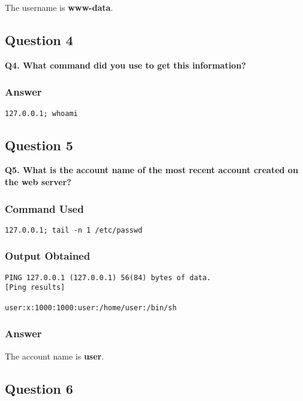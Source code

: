 \documentclass[12pt]{article}
\begin{document}
The username is \textbf{www-data}.

\subsection{Question 4}

\textbf{Q4. What command did you use to get this information?}

\subsubsection{Answer}



\begin{lstlisting}[style=terminal]
127.0.0.1; whoami
\end{lstlisting}

\subsection{Question 5}

\textbf{Q5. What is the account name of the most recent account created on the web server?}

\subsubsection{Command Used}

\begin{lstlisting}[style=terminal]
127.0.0.1; tail -n 1 /etc/passwd
\end{lstlisting}

\subsubsection{Output Obtained}

\begin{lstlisting}[style=terminal]
PING 127.0.0.1 (127.0.0.1) 56(84) bytes of data.
[Ping results]

user:x:1000:1000:user:/home/user:/bin/sh
\end{lstlisting}

\subsubsection{Answer}

The account name is \textbf{user}.

\subsection{Question 6}
\end{document}
